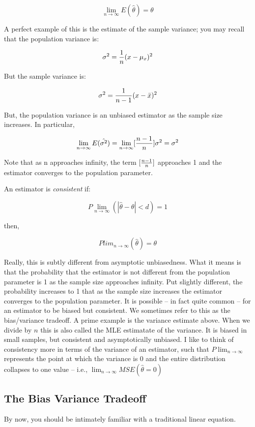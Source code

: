 \documentclass[
]{book}
\begin{document}
\[\lim_{n\to\infty} E(\hat{\theta})=\theta\]

A perfect example of this is the estimate of the sample variance; you may recall that the population variance is:

\[\sigma^2={{1}\over{n}}(x-\mu_{x})^2\]

But the sample variance is:

\[\sigma^2={{1}\over{n-1}}(x-\bar{x})^2\]

But, the population variance is an unbiased estimator as the sample size increases. In particular,

\[\lim_{n\to\infty} E(\hat{\sigma^2})=\lim_{n\to\infty} [{{n-1}\over{n}}]\sigma^2=\sigma^2\]

Note that as n approaches infinity, the term \([{{n-1}\over{n}}]\) approaches 1 and the estimator converges to the population parameter.

An estimator is \emph{consistent} if:

\[P\lim_{n\to\infty}(|\hat{\theta}-\theta|<d)=1\]

then,

\[Plim_{n\to\infty}(\hat{\theta})=\theta\]

Really, this is subtly different from asymptotic unbiasedness. What it means is that the probability that the estimator is not different from the population parameter is 1 as the sample size approaches infinity. Put slightly different, the probability increases to 1 that as the sample size increases the estimator converges to the population parameter. It is possible -- in fact quite common -- for an estimator to be biased but consistent. We sometimes refer to this as the bias/variance tradeoff. A prime example is the variance estimate above. When we divide by \(n\) this is also called the MLE estimatate of the variance. It is biased in small samples, but consistent and asymptotically unbiased. I like to think of consistency more in terms of the variance of an estimator, such that \(P\lim_{n\to\infty}\) represents the point at which the variance is 0 and the entire distribution collapses to one value -- i.e., \(\lim_{n\to\infty} MSE(\hat{\theta}=0)\)

\subsection{The Bias Variance Tradeoff}\label{the-bias-variance-tradeoff}

By now, you should be intimately familiar with a traditional linear equation.
\end{document}
